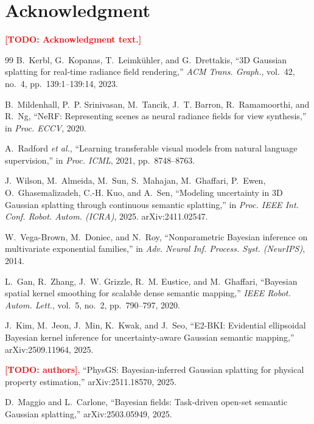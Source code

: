 \documentclass[journal]{IEEEtran}
\newcommand{\todo}[1]{\textcolor{red}{\textbf{[TODO: #1]}}}
\begin{document}
\section*{Acknowledgment}
\todo{Acknowledgment text.}

\begin{thebibliography}{99}
 B.~Kerbl, G.~Kopanas, T.~Leimk\"uhler, and G.~Drettakis,
``3D Gaussian splatting for real-time radiance field rendering,'' \emph{ACM
Trans. Graph.}, vol.~42, no.~4, pp.~139:1--139:14, 2023.

 B.~Mildenhall, P.~P. Srinivasan, M.~Tancik,
J.~T. Barron, R.~Ramamoorthi, and R.~Ng, ``NeRF: Representing scenes as neural
radiance fields for view synthesis,'' in \emph{Proc. ECCV}, 2020.

 A.~Radford \emph{et al.}, ``Learning transferable visual
models from natural language supervision,'' in \emph{Proc. ICML}, 2021,
pp.~8748--8763.

 J.~Wilson, M.~Almeida, M.~Sun, S.~Mahajan,
M.~Ghaffari, P.~Ewen, O.~Ghasemalizadeh, C.-H. Kuo, and A.~Sen, ``Modeling
uncertainty in 3D Gaussian splatting through continuous semantic splatting,''
in \emph{Proc. IEEE Int. Conf. Robot. Autom. (ICRA)}, 2025. arXiv:2411.02547.

 W.~Vega-Brown, M.~Doniec, and N.~Roy, ``Nonparametric
Bayesian inference on multivariate exponential families,'' in \emph{Adv. Neural
Inf. Process. Syst. (NeurIPS)}, 2014.

 L.~Gan, R.~Zhang, J.~W. Grizzle, R.~M. Eustice, and
M.~Ghaffari, ``Bayesian spatial kernel smoothing for scalable dense semantic
mapping,'' \emph{IEEE Robot. Autom. Lett.}, vol.~5, no.~2, pp.~790--797, 2020.

J.~Kim, M.~Jeon, J.~Min, K.~Kwak, and J.~Seo, ``E2-BKI: Evidential ellipsoidal
Bayesian kernel inference for uncertainty-aware Gaussian semantic mapping,''
arXiv:2509.11964, 2025.

\todo{authors}, ``PhysGS: Bayesian-inferred Gaussian splatting for physical
property estimation,'' arXiv:2511.18570, 2025.

 D.~Maggio and L.~Carlone, ``Bayesian fields:
Task-driven open-set semantic Gaussian splatting,'' arXiv:2503.05949, 2025.


\end{thebibliography}
\end{document}
